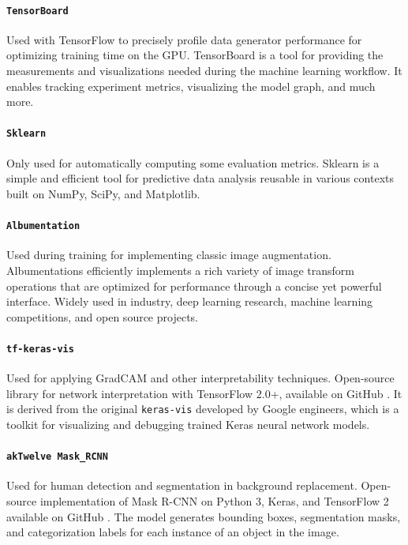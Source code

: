\paragraph*{\texttt{TensorBoard}}
Used with TensorFlow to precisely profile data generator performance for optimizing training time on the GPU. TensorBoard \cite{tensorboard} is a tool for providing the measurements and visualizations needed during the machine learning workflow. It enables tracking experiment metrics, visualizing the model graph, and much more.

\paragraph*{\texttt{Sklearn}}
Only used for automatically computing some evaluation metrics. Sklearn is a simple and efficient tool for predictive data analysis reusable in various contexts built on NumPy, SciPy, and Matplotlib.

\paragraph*{\texttt{Albumentation}}
Used during training for implementing classic image augmentation. Albumentations \cite{albumentations} efficiently implements a rich variety of image transform operations that are optimized for performance through a concise yet powerful interface. Widely used in industry, deep learning research, machine learning competitions, and open source projects.

\paragraph*{\texttt{tf-keras-vis}}
Used for applying GradCAM and other interpretability techniques. Open-source library for network interpretation with TensorFlow 2.0+, available on GitHub \cite{tf-keras-vis}. It is derived from the original \texttt{keras-vis} \cite{keras-vis} developed by Google engineers, which is a toolkit for visualizing and debugging trained Keras neural network models.

\paragraph*{\texttt{akTwelve Mask\_RCNN}}
Used for human detection and segmentation in background replacement. Open-source implementation of Mask R-CNN on Python 3, Keras, and TensorFlow 2 available on GitHub \cite{MaskRCNN_akTwelve}. The model generates bounding boxes, segmentation masks, and categorization labels for each instance of an object in the image.
